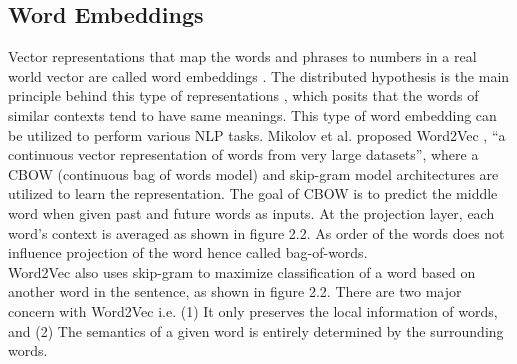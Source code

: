 \documentclass[%
	BCOR=8mm, %
	DIV=12,
	toc=bibliography, %
	toc=listof, %
	oneside, %
	egregdoesnotlikesansseriftitles, %
	]{scrbook}
\begin{document}
\subsection{Word Embeddings}
\label{subsection:wordembeddings}
Vector representations that map the words and phrases to numbers in a real world vector are called  word embeddings \cite{almeida_word_2019-1}. The distributed hypothesis is the main principle behind this type of representations \cite{harris_distributional_1954}, which posits that the words of similar contexts tend to have same meanings. This type of word embedding can be utilized to perform various NLP tasks. Mikolov et al. \cite{mikolov_efficient_2013} proposed Word2Vec , ``a continuous vector representation of words from very large datasets'', where a CBOW (continuous bag of words model) and skip-gram model architectures are utilized to learn the representation. The goal of CBOW is to predict the middle word when given past and future words as inputs. At the projection layer, each word's context is averaged as shown in figure 2.2. As order of the words does not influence projection of the word hence called bag-of-words. \\
Word2Vec also uses skip-gram to maximize classification of a word based on another word in the  sentence, as shown in figure 2.2.  There are two major concern with Word2Vec i.e. (1) It only preserves the local information of words,  and (2) The semantics of a given word is entirely determined by the surrounding words.
\end{document}

